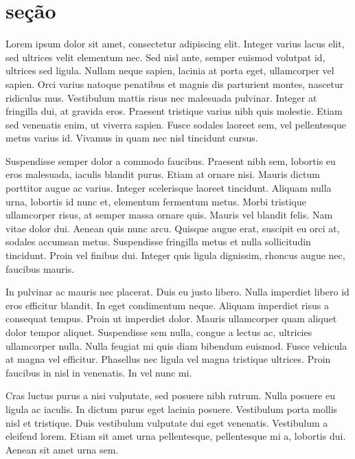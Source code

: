 \documentclass{article}
\begin{document}
	\section{seção}
	
	\onehalfspacing
	
	\hspace{2cm}Lorem ipsum dolor sit amet, consectetur adipiscing elit. Integer varius lacus elit, sed ultrices velit elementum nec. Sed nisl ante, semper euismod volutpat id, ultrices sed ligula. Nullam neque sapien, lacinia at porta eget, ullamcorper vel sapien. Orci varius natoque penatibus et magnis dis parturient montes, nascetur ridiculus mus. Vestibulum mattis risus nec malesuada pulvinar. Integer at fringilla dui, at gravida eros. Praesent tristique varius nibh quis molestie. Etiam sed venenatis enim, ut viverra sapien. Fusce sodales laoreet sem, vel pellentesque metus varius id. Vivamus in quam nec nisl tincidunt cursus.
	
	\vspace{2cm}
	
	Suspendisse semper dolor a commodo faucibus. Praesent nibh sem, lobortis eu eros malesuada, iaculis blandit purus. Etiam at ornare nisi. Mauris dictum porttitor augue ac varius. Integer scelerisque laoreet tincidunt. Aliquam nulla urna, lobortis id nunc et, elementum fermentum metus. Morbi tristique ullamcorper risus, at semper massa ornare quis. Mauris vel blandit felis. Nam vitae dolor dui. Aenean quis nunc arcu. Quisque augue erat, suscipit eu orci at, sodales accumsan metus. Suspendisse fringilla metus et nulla sollicitudin tincidunt. Proin vel finibus dui. Integer quis ligula dignissim, rhoncus augue nec, faucibus mauris.
	
	\doublespacing
	In pulvinar ac mauris nec placerat. Duis eu justo libero. Nulla imperdiet libero id eros efficitur blandit. In eget condimentum neque. Aliquam imperdiet risus a consequat tempus. Proin ut imperdiet dolor. Mauris ullamcorper quam aliquet dolor tempor aliquet. Suspendisse sem nulla, congue a lectus ac, ultricies ullamcorper nulla. Nulla feugiat mi quis diam bibendum euismod. Fusce vehicula at magna vel efficitur. Phasellus nec ligula vel magna tristique ultrices. Proin faucibus in nisl in venenatis. In vel nunc mi.
	
	Cras luctus purus a nisi vulputate, sed posuere nibh rutrum. Nulla posuere eu ligula ac iaculis. In dictum purus eget lacinia posuere. Vestibulum porta mollis nisl et tristique. Duis vestibulum vulputate dui eget venenatis. Vestibulum a eleifend lorem. Etiam sit amet urna pellentesque, pellentesque mi a, lobortis dui. Aenean sit amet urna sem.
	
\end{document}
